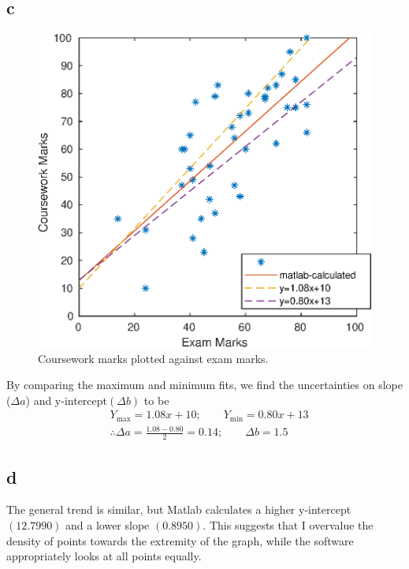 \subsection{c}
\begin{figure}[h]
	\includegraphics[scale=0.75, center]{./eps/topic1_c.eps}
	\caption{Coursework marks plotted against exam marks. }
	\label{fig:Topic1-c}
\end{figure}
By comparing the maximum and minimum fits, we find the uncertainties on slope ($\Delta a$) and y-intercept$(\Delta b)$ to be
\begin{equation}
\begin{split}
	&Y_{\max} = 1.08x + 10; \quad \quad Y_{\min} = 0.80x + 13 \\
	&\therefore \Delta a = \frac{1.08 - 0.80}{2} = 0.14; \quad \quad \Delta b = 1.5
\end{split}
\end{equation}


\subsection{d}
The general trend is similar, but Matlab calculates a higher y-intercept $(12.7990)$ and a lower slope $(0.8950)$. This suggests that I overvalue the density of points towards the extremity of the graph, while the software appropriately looks at all points equally.
